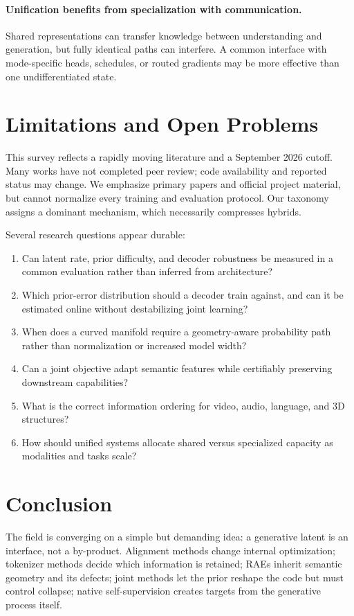 \documentclass{article}
\begin{document}
\paragraph{Unification benefits from specialization with communication.}
Shared representations can transfer knowledge between understanding and generation, but fully identical paths can interfere. A common interface with mode-specific heads, schedules, or routed gradients may be more effective than one undifferentiated state.

\section{Limitations and Open Problems}

This survey reflects a rapidly moving literature and a September 2026 cutoff. Many works have not completed peer review; code availability and reported status may change. We emphasize primary papers and official project material, but cannot normalize every training and evaluation protocol. Our taxonomy assigns a dominant mechanism, which necessarily compresses hybrids.

Several research questions appear durable:
\begin{enumerate}[leftmargin=*]
  \item Can latent rate, prior difficulty, and decoder robustness be measured in a common evaluation rather than inferred from architecture?
  \item Which prior-error distribution should a decoder train against, and can it be estimated online without destabilizing joint learning?
  \item When does a curved manifold require a geometry-aware probability path rather than normalization or increased model width?
  \item Can a joint objective adapt semantic features while certifiably preserving downstream capabilities?
  \item What is the correct information ordering for video, audio, language, and 3D structures?
  \item How should unified systems allocate shared versus specialized capacity as modalities and tasks scale?
\end{enumerate}

\section{Conclusion}

The field is converging on a simple but demanding idea: a generative latent is an interface, not a by-product. Alignment methods change internal optimization; tokenizer methods decide which information is retained; RAEs inherit semantic geometry and its defects; joint methods let the prior reshape the code but must control collapse; native self-supervision creates targets from the generative process itself.
\end{document}
